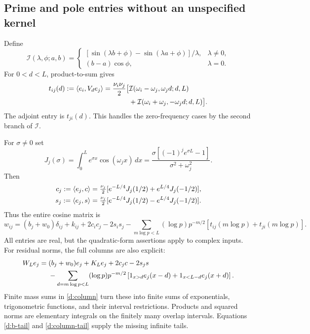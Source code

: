 \subsection{Prime and pole entries without an unspecified kernel}
Define
\[
\mathcal I(\lambda,\phi;a,b)=
\begin{cases}
[\sin(\lambda b+\phi)-\sin(\lambda a+\phi)]/\lambda,&\lambda\ne0,\\
(b-a)\cos\phi,&\lambda=0.
\end{cases}
\]
For $0<d<L$, product-to-sum gives
\begin{align}
t_{ij}(d):=\left\langle e_i,V_de_j\right\rangle
=\frac{\nu_i\nu_j}{2}\bigl[&\mathcal I(\omega_i-\omega_j,\omega_jd;d,L)\notag\\
&+\mathcal I(\omega_i+\omega_j,-\omega_jd;d,L)\bigr].
\label{d:shift-entries}
\end{align}
The adjoint entry is $t_{ji}(d)$. This handles the zero-frequency cases
by the second branch of $\mathcal I$.

For $\sigma\ne0$ set
\[
J_j(\sigma)=\int_0^Le^{\sigma x}\cos(\omega_jx)\,dx
=\frac{\sigma[(-1)^je^{\sigma L}-1]}{\sigma^2+\omega_j^2}.
\]
Then
\begin{align*}
c_j:=\left\langle e_j,c\right\rangle&=\tfrac{\nu_j}{2}
[e^{-L/4}J_j(1/2)+e^{L/4}J_j(-1/2)],\\
s_j:=\left\langle e_j,s\right\rangle&=\tfrac{\nu_j}{2}
[e^{-L/4}J_j(1/2)-e^{L/4}J_j(-1/2)].
\end{align*}
Thus the entire cosine matrix is
\begin{equation}\label{d:W-entries}
w_{ij}=(b_j+w_0)\delta_{ij}+k_{ij}+2c_ic_j-2s_is_j
-\sum_{m\log p<L}(\log p)p^{-m/2}
[t_{ij}(m\log p)+t_{ji}(m\log p)].
\end{equation}
All entries are real, but the quadratic-form assertions apply to complex
inputs. For residual norms, the full columns are also explicit:
\begin{align}
W_Le_j={}&(b_j+w_0)e_j+K_Le_j+2c_jc-2s_js\notag\\
&-\sum_{d=m\log p<L}(\log p)p^{-m/2}
\left[1_{x>d}e_j(x-d)+1_{x<L-d}e_j(x+d)\right].
\label{d:W-columns}
\end{align}
Finite mass sums in \eqref{d:column} turn these into finite sums of
exponentials, trigonometric functions, and their interval restrictions.
Products and squared norms are elementary integrals on the finitely many
overlap intervals. Equations \eqref{d:b-tail} and \eqref{d:column-tail}
supply the missing infinite tails.


